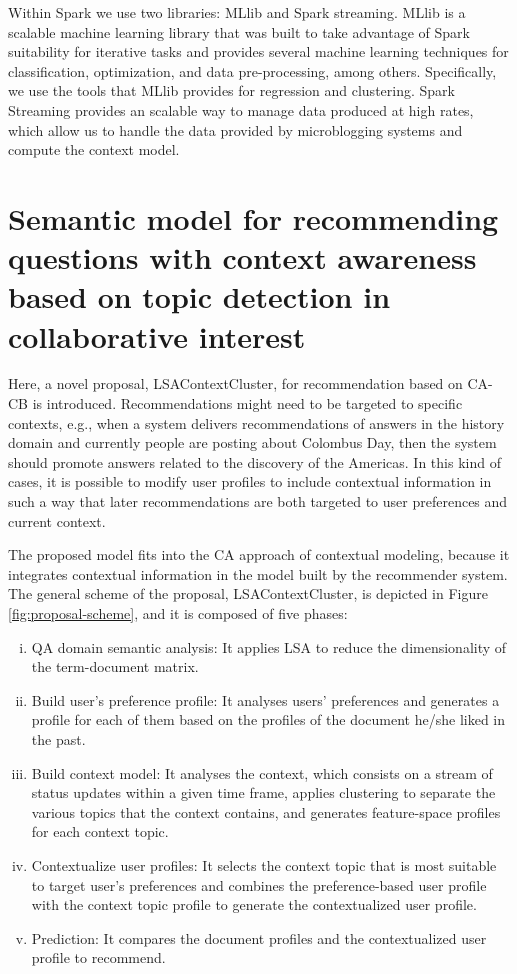 \documentclass[preprint]{elsarticle}
\begin{document}
\begin{spacing}{1.5}
Within Spark we use two libraries: MLlib and Spark streaming. MLlib is a scalable machine learning library \cite{Meng2016} that was built to take advantage of Spark suitability for iterative tasks and provides several machine learning techniques for classification, optimization, and data pre-processing, among others. Specifically, we use the tools that MLlib provides for regression and clustering. Spark Streaming \cite{Chintapalli2016} provides an scalable way to manage data produced at high rates, which allow us to handle the data provided by microblogging systems and compute the context model.

\section{Semantic model for recommending questions with context awareness based on topic detection in collaborative interest}
\label{sec:proposal}

Here, a novel proposal, LSAContextCluster, for recommendation based on CA-CB is introduced. Recommendations might need to be targeted to specific contexts, e.g., when a system delivers recommendations of answers in the history domain and currently people are posting about Colombus Day, then the system should promote answers related to the discovery of the Americas. In this kind of cases, it is possible to modify user profiles to include contextual information in such a way that later recommendations are both targeted to user preferences and current context.

The proposed model fits into the CA approach of contextual modeling, because it integrates contextual information in the model built by the recommender system. The general scheme of the proposal, LSAContextCluster, is depicted in Figure \ref{fig:proposal-scheme}, and it is composed of five phases:
\begin{enumerate}[(i)]
	\item QA domain semantic analysis: It applies LSA to reduce the dimensionality of the term-document matrix.
	\item Build user's preference profile: It analyses users' preferences and generates a profile for each of them based on the profiles of the document he/she liked in the past.
	\item Build context model: It analyses the context, which consists on a stream of status updates within a given time frame, applies clustering to separate the various topics that the context contains, and generates feature-space profiles for each context topic.
	\item Contextualize user profiles: It selects the context topic that is most suitable to target user's preferences and combines the preference-based user profile with the context topic profile to generate the contextualized user profile.
	\item Prediction: It compares the document profiles and the contextualized user profile to recommend.
\end{enumerate}


\end{spacing}
\end{document}
